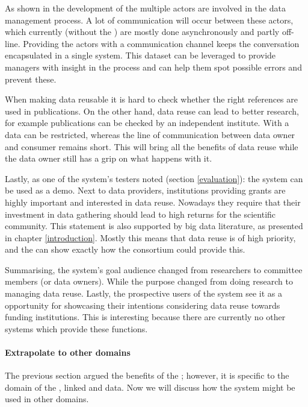 As shown in the development of the \ivfsystem{} multiple actors are involved in the data management process.
A lot of communication will occur between these actors, which currently (without the \ivfsystem{}) are mostly done asynchronously and partly off-line.
Providing the actors with a communication channel keeps the conversation encapsulated in a single system.
This dataset can be leveraged to provide managers with insight in the process and can help them spot possible errors and prevent these.

When making data reusable it is hard to check whether  the right references are used in publications.
On the other hand, data reuse can lead to better research, for example publications can be checked by an independent institute.
With a \ivfsystem{} data can be restricted, whereas the line of communication between data owner and consumer remains short.
This will bring all the benefits of data reuse while the data owner still has a grip on what happens with it.

Lastly, as one of the system's testers noted (section \ref{evaluation}): the system can be used as a demo.
Next to data providers, institutions providing grants are highly important and interested in data reuse.
Nowadays they require that their investment in data gathering should lead to high returns for the scientific community.
This statement is also supported by big data literature, as presented in chapter \ref{introduction}.
Mostly this means that data reuse is of high priority, and the \ivfsystem{} can show exactly how the \project{} consortium could provide this.

Summarising, the system's goal audience changed from researchers to committee members (or data owners).
While the purpose changed from doing research to managing data reuse.
Lastly, the prospective users of the system see it as a opportunity for showcasing their intentions considering data reuse towards funding institutions.
This is interesting because there are currently no other systems which provide these functions.

\paragraph{Extrapolate to other domains}

The previous section argued the benefits of the \ivfsystem{}; however, it is specific to the domain of the \projectdata{}, \ie{} linked \IVF{} and \PRN{} data.
Now we will discuss how the system might be used in other domains.

